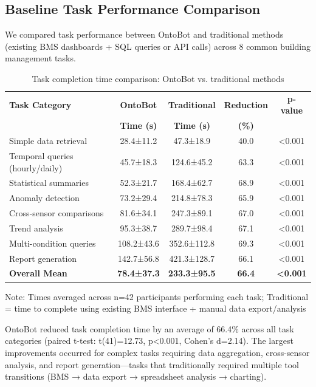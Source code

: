 \documentclass[acmlarge]{acmart}
\begin{document}
\subsection{Baseline Task Performance Comparison}

We compared task performance between OntoBot and traditional methods (existing BMS dashboards + SQL queries or API calls) across 8 common building management tasks.

\begin{table}[h]
\centering
\begin{threeparttable}
\caption{Task completion time comparison: OntoBot vs. traditional methods}
\label{tab:usefulness-comparison}
\scriptsize
\begin{tabular}{@{}lcccc@{}}
\toprule
\textbf{Task Category} & \textbf{OntoBot} & \textbf{Traditional} & \textbf{Reduction} & \textbf{p-value} \\
 & \textbf{Time (s)} & \textbf{Time (s)} & \textbf{(\%)} & \\
\midrule
Simple data retrieval & 28.4±11.2 & 47.3±18.9 & 40.0 & <0.001 \\
Temporal queries (hourly/daily) & 45.7±18.3 & 124.6±45.2 & 63.3 & <0.001 \\
Statistical summaries & 52.3±21.7 & 168.4±62.7 & 68.9 & <0.001 \\
Anomaly detection & 73.2±29.4 & 214.8±78.3 & 65.9 & <0.001 \\
Cross-sensor comparisons & 81.6±34.1 & 247.3±89.1 & 67.0 & <0.001 \\
Trend analysis & 95.3±38.7 & 289.7±98.4 & 67.1 & <0.001 \\
Multi-condition queries & 108.2±43.6 & 352.6±112.8 & 69.3 & <0.001 \\
Report generation & 142.7±56.8 & 421.3±128.7 & 66.1 & <0.001 \\
\midrule
\textbf{Overall Mean} & \textbf{78.4±37.3} & \textbf{233.3±95.5} & \textbf{66.4} & \textbf{<0.001} \\
\bottomrule
\end{tabular}
\begin{tablenotes}
\small
\item Note: Times averaged across n=42 participants performing each task; Traditional = time to complete using existing BMS interface + manual data export/analysis
\end{tablenotes}
\end{threeparttable}
\end{table}

OntoBot reduced task completion time by an average of 66.4\% across all task categories (paired t-test: t(41)=12.73, p<0.001, Cohen's d=2.14). The largest improvements occurred for complex tasks requiring data aggregation, cross-sensor analysis, and report generation—tasks that traditionally required multiple tool transitions (BMS → data export → spreadsheet analysis → charting).
\end{document}
